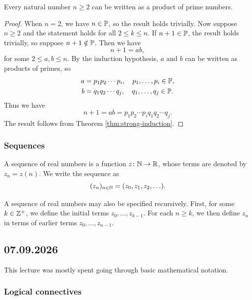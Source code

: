 \documentclass[11pt,a4paper]{amsart}
\begin{document}
\begin{theorem}
  Every natural number \(n \geq 2\) can be written as a product of
  prime numbers.
\end{theorem}

\begin{proof}
  When \(n = 2\), we have \(n \in \mathbb{P}\), so the result holds trivially.
  Now suppose \(n \geq 2\) and the statement holds for all
  \(2 \leq k \leq n\). If \(n + 1 \in \mathbb{P}\), the result holds trivially, so
  suppose \(n + 1 \notin \mathbb{P}\). Then we have
  \[
    n + 1 = ab,
  \]
  for some \(2 \leq a,b \leq n\). By the induction hypothesis, \(a\) and
  \(b\) can be written as products of primes, so
  \[
    \begin{aligned}
      a &= p_1p_2\cdots p_i, \quad p_1,\ldots,p_i \in \mathbb{P}, \\
      b &= q_1q_2\cdots q_j, \quad q_1,\ldots,q_j \in \mathbb{P}.
    \end{aligned}
  \]
  Thus we have
  \[
    n + 1 = ab = p_1p_2\cdots p_iq_1q_2\cdots q_j.
  \]
  The result follows from Theorem \ref{thm:strong-induction}.
\end{proof}

\subsubsection{Sequences}

\begin{definition}
  A sequence of real numbers is a function \(z\colon \mathbb{N} \rightarrow \mathbb{R}\),
  whose terms are denoted by \(z_n = z(n)\). We write the sequence as
  \[
    (z_n)_{n \in \mathbb{N}} = (z_0,z_1,z_2,\ldots).
  \]
\end{definition}

\begin{definition}
  A sequence of real numbers may also be specified recursively. First, for
  some \(k \in \mathbb{Z}^+\), we define the initial terms
  \(z_0,\ldots,z_{k-1}\). For each \(n \geq k\), we then define \(z_n\) in
  terms of earlier terms \(z_0,\ldots,z_{n-1}\).
\end{definition}

\subsection{07.09.2026}

This lecture was mostly spent going through basic mathematical notation.

\subsubsection{Logical connectives}
\end{document}
